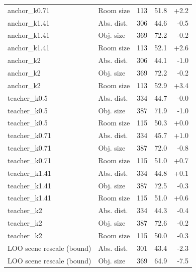 \begin{tabular}{llrrr}
anchor\_k0.71 & Room size & 113 & 51.8 & +2.2 \\
anchor\_k1.41 & Abs. dist. & 306 & 44.6 & -0.5 \\
anchor\_k1.41 & Obj. size & 369 & 72.2 & -0.2 \\
anchor\_k1.41 & Room size & 113 & 52.1 & +2.6 \\
anchor\_k2 & Abs. dist. & 306 & 44.1 & -1.0 \\
anchor\_k2 & Obj. size & 369 & 72.2 & -0.2 \\
anchor\_k2 & Room size & 113 & 52.9 & +3.4 \\
teacher\_k0.5 & Abs. dist. & 334 & 44.7 & -0.0 \\
teacher\_k0.5 & Obj. size & 387 & 71.9 & -1.0 \\
teacher\_k0.5 & Room size & 115 & 50.3 & +0.0 \\
teacher\_k0.71 & Abs. dist. & 334 & 45.7 & +1.0 \\
teacher\_k0.71 & Obj. size & 387 & 72.0 & -0.8 \\
teacher\_k0.71 & Room size & 115 & 51.0 & +0.7 \\
teacher\_k1.41 & Abs. dist. & 334 & 44.8 & +0.1 \\
teacher\_k1.41 & Obj. size & 387 & 72.5 & -0.3 \\
teacher\_k1.41 & Room size & 115 & 51.0 & +0.6 \\
teacher\_k2 & Abs. dist. & 334 & 44.3 & -0.4 \\
teacher\_k2 & Obj. size & 387 & 72.6 & -0.2 \\
teacher\_k2 & Room size & 115 & 50.0 & -0.3 \\
LOO scene rescale (bound) & Abs. dist. & 301 & 43.4 & -2.3 \\
LOO scene rescale (bound) & Obj. size & 369 & 64.9 & -7.5 \\
\bottomrule
\end{tabular}
